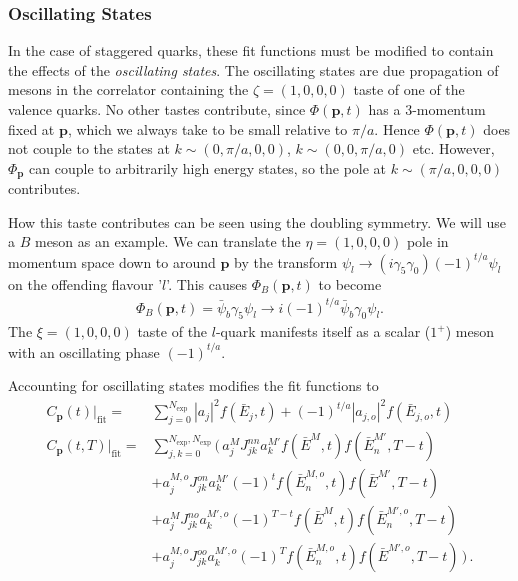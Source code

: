 \subsubsection{Oscillating States}

In the case of staggered quarks, these fit functions must be modified to contain the effects of the {\it{oscillating states}}. The oscillating states are due propagation of mesons in the correlator containing the $\zeta=(1,0,0,0)$ taste of one of the valence quarks. No other tastes contribute, since $\Phi({{\textbf{p}}},t)$ has a 3-momentum fixed at ${\textbf{p}}$, which we always take to be small relative to $\pi/a$. Hence $\Phi({\textbf{p}},t)$ does not couple to the states at $k\sim(0,\pi/a,0,0)$, $k\sim(0,0,\pi/a,0)$ etc. However, $\Phi_{{\textbf{p}}}$ can couple to arbitrarily high energy states, so the pole at $k\sim(\pi/a,0,0,0)$ contributes.

How this taste contributes can be seen using the doubling symmetry. We will use a $B$ meson as an example. We can translate the $\eta=(1,0,0,0)$ pole in momentum space down to around ${\textbf{p}}$ by the transform $\psi_l\to (i\gamma_5\gamma_0)(-1)^{t/a} \psi_l$ on the offending flavour '$l$'. This causes $\Phi_B({\textbf{p}},t)$ to become
\begin{align}
  \Phi_B({\textbf{p}},t) = \bar{\psi}_b\gamma_5\psi_l \to i(-1)^{t/a}\bar{\psi}_b\gamma_0\psi_l.
\end{align}
The $\xi=(1,0,0,0)$ taste of the $l$-quark manifests itself as a scalar ($1^+$) meson with an oscillating phase $(-1)^{t/a}$.

Accounting for oscillating states modifies the fit functions to
\begin{align}
  \label{eq:2ptcorrelator_real}
  C_{\textbf{p}}(t)|_{\text{fit}} =& \sum_{j=0}^{N_{\text{exp}}} |a_j|^2 f(\bar{E}_j,t) + (-1)^{t/a} |a_{j,o}|^2 f(\bar{E}_{j,o},t)\, \\
  \nonumber
  C_{\textbf{p}}(t,T)|_{\text{fit}} =& \sum_{j,k=0}^{N_{\text{exp}},N_{\text{exp}}} \Big(\, a^{M}_j J^{nn}_{jk} a^{M'}_k f(\bar{E}^{M},t) f(\bar{E}^{M'}_n,T-t)
  \\ \nonumber
  &+a^{M,o}_j J^{on}_{jk} a^{M'}_k (-1)^t f(\bar{E}^{M,o}_n,t) f(\bar{E}^{M'},T-t)
  \\ \nonumber
  &+a^{M}_j J^{no}_{jk} a^{M',o}_k (-1)^{T-t} f(\bar{E}^{M},t) f(\bar{E}^{M',o}_n,T-t)
  \\
  &+a^{M,o}_j J^{oo}_{jk} a^{M',o}_k (-1)^T f(\bar{E}^{M,o}_n,t) f(\bar{E}^{M',o},T-t) \,\Big)\,.
  \label{eq:3ptcorrelator_real}
\end{align}

